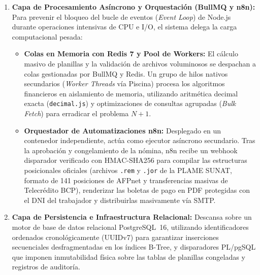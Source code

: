 \begin{enumerate}[leftmargin=*]
    \item \textbf{Capa de Procesamiento Asíncrono y Orquestación (BullMQ y n8n):} 
        Para prevenir el bloqueo del bucle de eventos (\textit{Event Loop}) de Node.js durante operaciones intensivas de CPU e I/O, el sistema delega la carga computacional pesada:
    \begin{itemize}
        \item \textbf{Colas en Memoria con Redis 7 y Pool de Workers:} El cálculo masivo de planillas y la validación de archivos voluminosos se despachan a colas gestionadas por BullMQ y Redis. 
                                                                        Un grupo de hilos nativos secundarios (\textit{Worker Threads} vía Piscina) procesa los algoritmos financieros en aislamiento de memoria, 
                                                                        utilizando aritmética decimal exacta (\texttt{decimal.js}) y optimizaciones de consultas agrupadas (\textit{Bulk Fetch}) 
                                                                        para erradicar el problema $N+1$.
        
        \item \textbf{Orquestador de Automatizaciones n8n:} Desplegado en un contenedor independiente, actúa como ejecutor asíncrono secundario. 
                                                             Tras la aprobación y congelamiento de la nómina, 
                                                             n8n recibe un webhook disparador verificado con HMAC-SHA256 para compilar las estructuras posicionales oficiales 
                                                             (archivos \texttt{.rem} y \texttt{.jor} de la PLAME SUNAT, formato de 141 posiciones de AFPnet y transferencias masivas de Telecrédito BCP), 
                                                             renderizar las boletas de pago en PDF protegidas con el DNI del trabajador y distribuirlas masivamente vía SMTP.
    \end{itemize}

    \item \textbf{Capa de Persistencia e Infraestructura Relacional:} Descansa sobre un motor de base de datos relacional PostgreSQL~16, 
                                                                        utilizando identificadores ordenados cronológicamente (UUIDv7) para garantizar inserciones secuenciales desfragmentadas en los índices B-Tree, 
                                                                        y disparadores PL/pgSQL que imponen inmutabilidad física sobre las tablas de planillas congeladas y registros de auditoría.
\end{enumerate}


